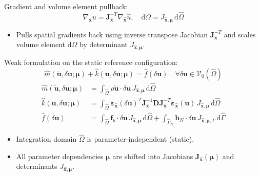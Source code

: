 \documentclass[12pt,a4paper,oneside]{report}
\newcommand{\vect}[1]{\mathbf{#1}}
\newcommand{\mat}[1]{\mathbf{#1}}
\begin{document}
Gradient and volume element pullback:
\begin{equation}
    \nabla_{\vect{x}} u = \mathbf{J}_{\hat{\vect{x}}}^{-T} \nabla_{\hat{\vect{x}}} \hat{u}, \quad \mathrm{d}\Omega = J_{\hat{\vect{x}}, \boldsymbol{\mu}} \, \mathrm{d}\hat{\Omega}
\end{equation}
\begin{tcolorbox}[colback=gray!5!white,colframe=gray!60!black,title={Term Definitions \& Parameter Dependencies}]
\begin{itemize}
    \item Pulls spatial gradients back using inverse transpose Jacobian $\mathbf{J}_{\hat{\vect{x}}}^{-T}$ and scales volume element $\mathrm{d}\Omega$ by determinant $J_{\hat{\vect{x}}, \boldsymbol{\mu}}$.
\end{itemize}
\end{tcolorbox}

Weak formulation on the static reference configuration:
\begin{equation}
    \hat{m}(\ddot{\vect{u}}, \delta\vect{u}; \boldsymbol{\mu}) + \hat{k}(\vect{u}, \delta\vect{u}; \boldsymbol{\mu}) = \hat{f}(\delta\vect{u}) \quad \forall \delta\vect{u} \in \mathcal{V}_0(\hat{\Omega})
\end{equation}
\begin{align}
    \hat{m}(\ddot{\vect{u}}, \delta\vect{u}; \boldsymbol{\mu}) & = \int_{\hat{\Omega}} \rho \ddot{\vect{u}} \cdot \delta\vect{u} \, J_{\hat{\vect{x}}, \boldsymbol{\mu}} \, \mathrm{d}\hat{\Omega}                                                                                                                                                 \\
    \hat{k}(\vect{u}, \delta\vect{u}; \boldsymbol{\mu})        & = \int_{\hat{\Omega}} \boldsymbol{\varepsilon}_{\hat{\vect{x}}}(\delta\vect{u})^T \mathbf{J}_{\hat{\vect{x}}}^{-1} \mat{D} \mathbf{J}_{\hat{\vect{x}}}^{-T} \boldsymbol{\varepsilon}_{\hat{\vect{x}}}(\vect{u}) \, J_{\hat{\vect{x}}, \boldsymbol{\mu}} \, \mathrm{d}\hat{\Omega} \\
    \hat{f}(\delta\vect{u})                                    & = \int_{\hat{\Omega}} \vect{f}_b \cdot \delta\vect{u} \, J_{\hat{\vect{x}}, \boldsymbol{\mu}} \, \mathrm{d}\hat{\Omega} + \int_{\hat{\Gamma}_N} \vect{h}_N \cdot \delta\vect{u} \, J_{\hat{\vect{x}}, \boldsymbol{\mu}, \Gamma} \, \mathrm{d}\hat{\Gamma}
\end{align}
\begin{tcolorbox}[colback=gray!5!white,colframe=gray!60!black,title={Term Definitions \& Parameter Dependencies}]
\begin{itemize}
    \item Integration domain $\hat{\Omega}$ is parameter-independent (static).
    \item All parameter dependencies $\boldsymbol{\mu}$ are shifted into Jacobians $\mathbf{J}_{\hat{\vect{x}}}(\boldsymbol{\mu})$ and determinants $J_{\hat{\vect{x}}, \boldsymbol{\mu}}$.
\end{itemize}
\end{tcolorbox}
\end{document}
